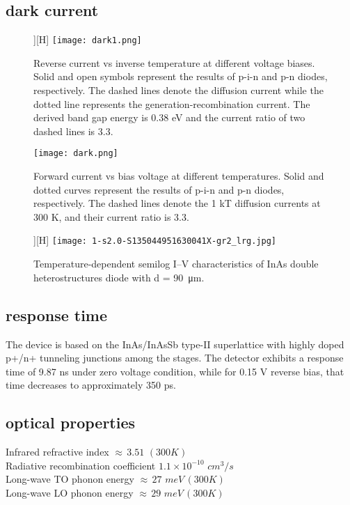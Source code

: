 \documentclass{article}
\begin{document}
    \subsection{dark current}
        \begin{figure}][H]
            \centering
            \texttt{[image: dark1.png]}
            \caption{Reverse current vs inverse temperature at different voltage biases.
                    Solid and open symbols represent the results of p-i-n and p-n diodes,
                    respectively. The dashed lines denote the diffusion current while the dotted
                    line represents the generation-recombination current. The derived band gap
                    energy is 0.38 eV and the current ratio of two dashed lines is 3.3.}
        \end{figure}
    
        \begin{figure}[H]
            \centering
            \texttt{[image: dark.png]}
            \caption{Forward current vs bias voltage at different temperatures. Solid and
                    dotted curves represent the results of p-i-n and p-n diodes, respectively.
                    The dashed lines denote the 1 kT diffusion currents at 300 K, and their
                    current ratio is 3.3.}
        \end{figure}
        
        \begin{figure}][H]
            \centering
            \texttt{[image: 1-s2.0-S135044951630041X-gr2\_lrg.jpg]}
            \caption{Temperature-dependent semilog I–V characteristics of InAs double heterostructures diode with d = \SI{90}                     {\micro\meter}.}
        \end{figure}

    \newpage
    \subsection{response time}
    
        The device is based on the InAs/InAsSb type-II superlattice with highly doped p+/n+ tunneling junctions among the stages. The detector exhibits a response time of 9.87 ns under zero voltage condition, while for 0.15 V reverse bias, that time decreases to approximately 350 ps.

    \subsection{optical properties}
        Infrared refractive index	$\approx\, 3.51\,\,(300 K)$\\
        Radiative recombination coefficient	$1.1\times10^{-10}\,\, cm^3/s$\\
        Long-wave TO phonon energy $\approx\, 27\,\, meV\, (300 K)$\\
        Long-wave LO phonon energy $\approx\, 29\,\, meV\, (300 K)$
\end{document}

